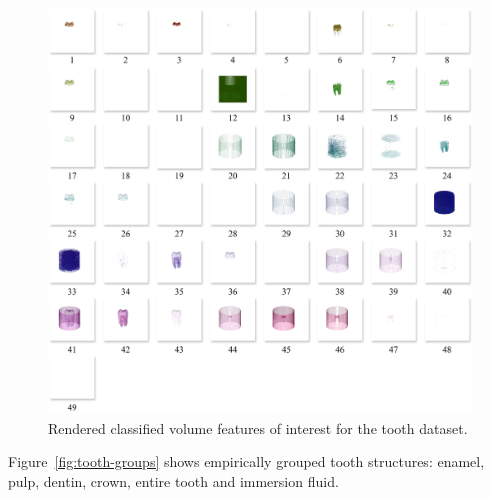 \begin{figure}[htb!]
    \centering
    \includegraphics[width=\columnwidth]{figs/tooth-clusters.jpg} 
    \caption{Rendered classified volume features of interest for the tooth dataset.}
    \label{fig:tooth-clusters}
\end{figure}

Figure~\ref{fig:tooth-groups} shows empirically grouped tooth structures: enamel, pulp, dentin, crown, entire tooth and immersion fluid.

